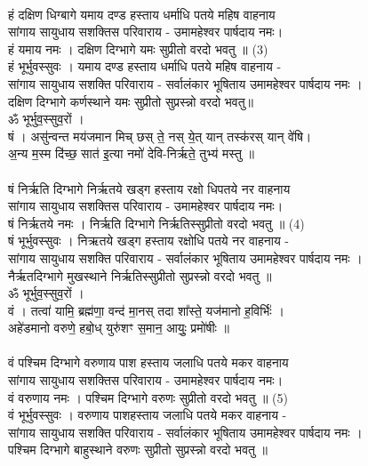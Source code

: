\\
हं दक्षिण धिग्बागे यमाय दण्ड हस्ताय धर्माधि पतये महिष वाहनाय\\
सांगाय सायुधाय सशक्तिस परिवाराय -  उमामहेश्वर पार्षदाय नमः।\\
हं यमाय नमः । दक्षिण दिग्भागे यमः सुप्रीतो  वरदो भवतु ॥ (3)\\
{\small हं भूर्भुवस्सुवः । यमाय दण्ड हस्ताय धर्माधि पतये महिष वाहनाय -\\
सांगाय सायुधाय सशक्ति परिवाराय - सर्वालंकार भूषिताय उमामहेश्वर पार्षदाय नमः ।\\
दक्षिण दिग्भागे कर्णस्थाने यमः सुप्रीतो सुप्रस्न्नो वरदो भवतु॥}\\
ॐ भूर्भुव॒स्सुव॒रों ।\\
षं । असु॑न्वन्त मय॑जमान मिच् छस् ते॒ नस् ये॒त् यान् तस्क॑रस् यान् वे॑षि।\\
अ॒न्य म॒स्म दि॑च्छ॒ सात॑ इ॒त्या नमो॑ देवि-निर्ऋते॒ तुभ्य॑ मस्तु ॥\\
\\
षं निर्ऋति दिग्भागे निर्ऋतये खड्ग हस्ताय रक्षो धिपतये नर वाहनाय\\
सांगाय सायुधाय सशक्तिस परिवाराय -  उमामहेश्वर पार्षदाय नमः।\\
षं निर्ऋतये नमः । निर्ऋति दिग्भागे निर्ऋतिस्सुप्रीतो वरदो भवतु ॥ (4)\\
{\small षं भूर्भुवस्सुवः । निऋतये खड्ग हस्ताय रक्षोधि पतये नर वाहनाय -\\
सांगाय सायुधाय सशक्ति परिवाराय - सर्वालंकार भूषिताय उमामहेश्वर पार्षदाय नमः ।\\
नैर्ऋतदिग्भागे मुखस्थाने निर्ऋतिस्सुप्रीतो सुप्रस्न्नो वरदो भवतु ॥}\\
ॐ भूर्भुव॒स्सुव॒रों ।\\
वं । तत्वा॑ यामि॒ ब्रह्म॑णा॒ वन्द॑ मा॒नस् तदा शा᳚स्ते॒ यज॑मानो ह॒विर्भिः॑ ।\\
अहे॑डमानो वरुणे॒ हबो॒ध् युरु॑शꣳ स॒मान॒ आयुः॒ प्रमो॑षीः ॥\\
\\
वं पश्चिम दिग्भागे वरुणाय पाश हस्ताय जलाधि पतये मकर वाहनाय\\
सांगाय सायुधाय सशक्तिस परिवाराय -  उमामहेश्वर पार्षदाय नमः।\\
वं वरुणाय नमः । पश्चिम दिग्भागे वरुणः सुप्रीतो वरदो भवतु ॥ (5)\\
{\small वं भूर्भुवस्सुवः । वरुणाय पाशहस्ताय जलाधि पतये मकर वाहनाय -\\
सांगाय सायुधाय सशक्ति परिवाराय - सर्वालंकार भूषिताय उमामहेश्वर पार्षदाय नमः ।\\
पश्चिम दिग्भागे बाहुस्थाने वरुणः सुप्रीतो सुप्रस्न्नो वरदो भवतु ॥}\\
